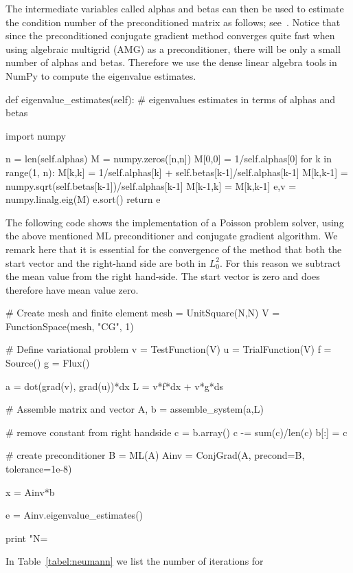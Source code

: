 The intermediate variables called alphas and betas can then be used to
estimate the condition number of the preconditioned matrix as follows;
see~\citet{Saad2003}.  Notice that since the preconditioned
conjugate gradient method converges quite fast when using algebraic
multigrid (AMG) as a preconditioner, there will be only a
small number of alphas and betas. Therefore we use the dense linear
algebra tools in NumPy to compute the eigenvalue estimates.
\begin{python}
    def eigenvalue_estimates(self):
        # eigenvalues estimates in terms of alphas and betas

        import numpy

        n = len(self.alphas)
        M = numpy.zeros([n,n])
        M[0,0] = 1/self.alphas[0]
        for k in range(1, n):
            M[k,k] = 1/self.alphas[k] + self.betas[k-1]/self.alphas[k-1]
            M[k,k-1] = numpy.sqrt(self.betas[k-1])/self.alphas[k-1]
            M[k-1,k] = M[k,k-1]
        e,v = numpy.linalg.eig(M)
        e.sort()
        return e
\end{python}
The following code shows the implementation of a Poisson problem
solver, using the above mentioned ML preconditioner and conjugate
gradient algorithm. We remark here that it is essential for the
convergence of the method that both the start vector and the
right-hand side are both in $L^2_0$. For this reason we subtract the
mean value from the right hand-side.  The start vector is zero and
does therefore have mean value zero.
\begin{python}
# Create mesh and finite element
mesh = UnitSquare(N,N)
V = FunctionSpace(mesh, "CG", 1)

# Define variational problem
v = TestFunction(V)
u = TrialFunction(V)
f = Source()
g = Flux()

a = dot(grad(v), grad(u))*dx
L = v*f*dx + v*g*ds

# Assemble matrix and vector
A, b = assemble_system(a,L)

# remove constant from right handside
c = b.array()
c -= sum(c)/len(c)
b[:] = c

# create preconditioner
B = ML(A)
Ainv = ConjGrad(A, precond=B, tolerance=1e-8)

x = Ainv*b

e = Ainv.eigenvalue_estimates()

print "N=%
\end{python}
In Table~\ref{tabel:neumann} we list the number of iterations for
